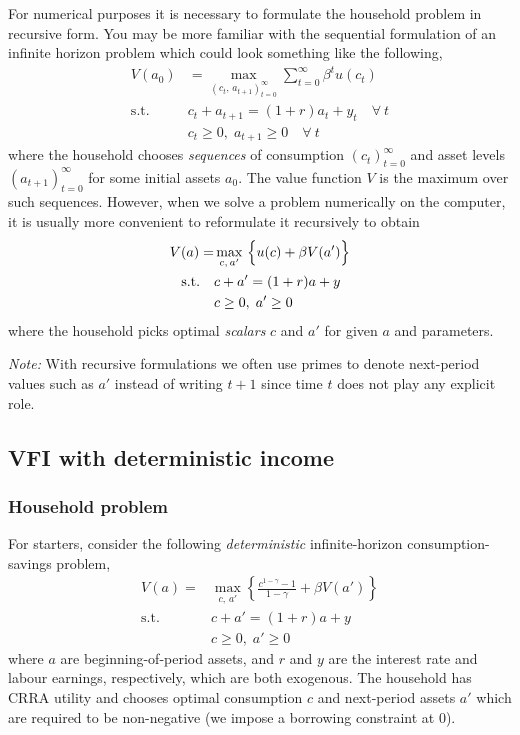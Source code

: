 \documentclass{scrartcl}
\begin{document}
    For numerical purposes it is necessary to formulate the household
problem in recursive form. You may be more familiar with the sequential
formulation of an infinite horizon problem which could look something
like the following, \[
\begin{aligned}
V(a_0) &= \max_{(c_t,\,a_{t+1})_{t=0}^{\infty}}
\sum_{t=0}^{\infty} \beta^t u(c_t)  \\
\text{s.t.} \quad & c_t + a_{t+1} = (1+r)a_t + y_t \quad \forall~t \\
& c_t \geq 0,\; a_{t+1} \geq 0 \quad \forall~t
\end{aligned}
\] where the household chooses \emph{sequences} of consumption
\((c_t)_{t=0}^{\infty}\) and asset levels \((a_{t+1})_{t=0}^{\infty}\)
for some initial assets \(a_0\). The value function \(V\) is the maximum
over such sequences. However, when we solve a problem numerically on the
computer, it is usually more convenient to reformulate it recursively to
obtain \[
\begin{aligned}
V(a) = &\max_{c,\,a'}~\Bigl\{ u(c)
    + \beta V(a') \Bigr\} \\
    \text{s.t.} \quad &c + a' = (1+r)a  + y \\
    & c \geq 0,\; a' \geq 0
\end{aligned}
\] where the household picks optimal \emph{scalars} \(c\) and \(a'\) for
given \(a\) and parameters.

\emph{Note:} With recursive formulations we often use primes to denote
next-period values such as \(a'\) instead of writing \(t+1\) since time
\(t\) does not play any explicit role.

    \hypertarget{vfi-with-deterministic-income}{%
\subsection{VFI with deterministic
income}\label{vfi-with-deterministic-income}}

    \hypertarget{household-problem}{%
\subsubsection{Household problem}\label{household-problem}}

For starters, consider the following \emph{deterministic}
infinite-horizon consumption-savings problem, \[
\begin{aligned}
V(a) = &\max_{c,\,a'} \left\{ 
    \frac{c^{1-\gamma} - 1}{1-\gamma}
    + \beta V(a') \right\} \\
    \text{s.t.} \quad &c + a' = (1+r)a  + y \\
    &c \geq 0,\; a' \geq 0
\end{aligned}
\] where \(a\) are beginning-of-period assets, and \(r\) and \(y\) are
the interest rate and labour earnings, respectively, which are both
exogenous. The household has CRRA utility and chooses optimal
consumption \(c\) and next-period assets \(a'\) which are required to be
non-negative (\ie we impose a borrowing constraint at 0).
\end{document}
